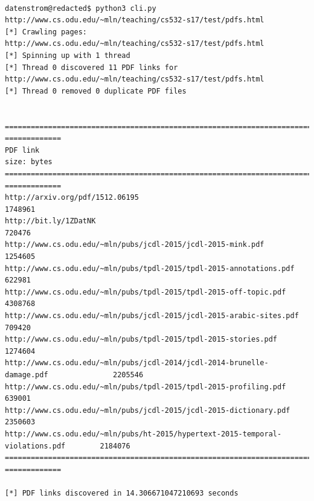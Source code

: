 \documentclass[12pt, a4paper]{article}
\begin{document}
\begin{minipage}{\linewidth} %
\vspace{2em}
\begin{verbatim}

datenstrom@redacted$ python3 cli.py http://www.cs.odu.edu/~mln/teaching/cs532-s17/test/pdfs.html
[*] Crawling pages:
http://www.cs.odu.edu/~mln/teaching/cs532-s17/test/pdfs.html
[*] Spinning up with 1 thread
[*] Thread 0 discovered 11 PDF links for http://www.cs.odu.edu/~mln/teaching/cs532-s17/test/pdfs.html
[*] Thread 0 removed 0 duplicate PDF files


==============================================================================  =============
PDF link                                                                          size: bytes
==============================================================================  =============
http://arxiv.org/pdf/1512.06195                                                       1748961
http://bit.ly/1ZDatNK                                                                  720476
http://www.cs.odu.edu/~mln/pubs/jcdl-2015/jcdl-2015-mink.pdf                          1254605
http://www.cs.odu.edu/~mln/pubs/tpdl-2015/tpdl-2015-annotations.pdf                    622981
http://www.cs.odu.edu/~mln/pubs/tpdl-2015/tpdl-2015-off-topic.pdf                     4308768
http://www.cs.odu.edu/~mln/pubs/jcdl-2015/jcdl-2015-arabic-sites.pdf                   709420
http://www.cs.odu.edu/~mln/pubs/tpdl-2015/tpdl-2015-stories.pdf                       1274604
http://www.cs.odu.edu/~mln/pubs/jcdl-2014/jcdl-2014-brunelle-damage.pdf               2205546
http://www.cs.odu.edu/~mln/pubs/tpdl-2015/tpdl-2015-profiling.pdf                      639001
http://www.cs.odu.edu/~mln/pubs/jcdl-2015/jcdl-2015-dictionary.pdf                    2350603
http://www.cs.odu.edu/~mln/pubs/ht-2015/hypertext-2015-temporal-violations.pdf        2184076
==============================================================================  =============

[*] PDF links discovered in 14.306671047210693 seconds

\end{verbatim}
\vspace{2em}
\end{minipage}


\end{document}
